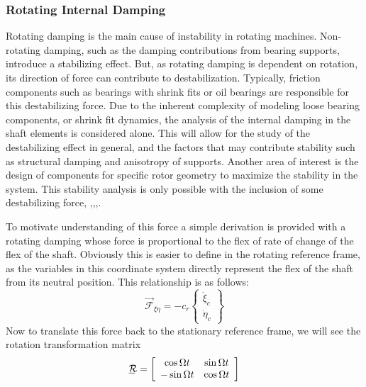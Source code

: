 \subsubsection{Rotating Internal Damping} \label{Rotating Internal Damping}
Rotating damping is the main cause of instability in rotating machines. Non-rotating damping, such as the damping contributions from bearing supports, introduce a stabilizing effect. But, as rotating damping is dependent on rotation, its direction of force can contribute to destabilization. Typically, friction components such as bearings with shrink fits or oil bearings are responsible for this destabilizing force. Due to the inherent complexity of modeling loose bearing components, or shrink fit dynamics, the analysis of the internal damping in the shaft elements is considered alone. This will allow for the study of the destabilizing effect in general, and the factors that may contribute stability such as structural damping and anisotropy of supports. Another area of interest is the design of components for specific rotor geometry to maximize the stability in the system. This stability analysis is only possible with the inclusion of some destabilizing force, \cite{genta2007dynamics},\cite{genta2004persistent},\cite{kandil2005rotor},\cite{zorzi1977finite}.\par 
To motivate understanding of this force a simple derivation is provided with a rotating damping whose force is proportional to the flex of rate of change of the flex of the shaft. Obviously this is easier to define in the rotating reference frame, as the variables in this coordinate system directly represent the flex of the shaft from its neutral position. This relationship is as follows:
\begin{equation}\label{eq:LinearViscousDampingRot}
\vec{\mathcal{F}}_{\xi\eta}=-c_r
\left\{\begin{array}{c}
\dot{\xi}_c\\
\dot{\eta}_c
\end{array}\right\}
\end{equation}
Now to translate this force back to the stationary reference frame, we will see the rotation transformation matrix 
\begin{equation}\label{eq:RotationTransformation2D}
\bunderline{\mathcal{R}}=\left[\begin{array}{cc}
\cos{\Omega t}& \sin{\Omega t}\\
-\sin{\Omega t}& \cos{\Omega t}
\end{array}\right]
\end{equation}
